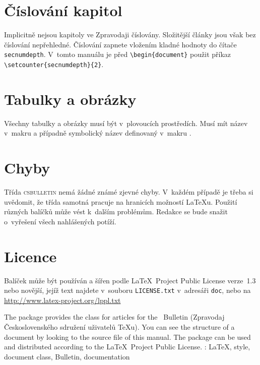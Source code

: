 \documentclass{csbulletin}
\let\pkg\textsc
\begin{document}
\section{Číslování kapitol}
Implicitně nejsou kapitoly ve Zpravodaji číslovány. Složitější články jsou však bez číslování
nepřehledné. Číslování zapnete vložením kladné hodnoty do čítače \texttt{secnumdepth}. V~tomto
manuálu je před \verb;\begin{document}; použit příkaz \verb;\setcounter{secnumdepth}{2};.

\section{Tabulky a obrázky}
Všechny
tabulky a obrázky musí být v~plovoucích prostředích. Musí mít název v~makru  a
případně symbolický název definovaný v~makru .

\section{Chyby}
Třída \pkg{csbulletin} nemá žádné známé zjevné chyby.
V~každém případě je třeba si uvědomit, že třída samotná pracuje na hranicích možností \LaTeX{}u.
Použití různých balíčků může vést k~dalším problémům. Redakce se bude snažit o~vyřešení všech
nahlášených potíží.

\section{Licence}
Balíček může být používán a šířen podle \LaTeX\ Project Public License verze~1.3 nebo novější, jejíž
text najdete v~souboru \texttt{LICENSE.txt} v~adresáři \texttt{doc}, nebo na
\url{http://www.latex-project.org/lppl.txt}

\begin{summary}
The package provides the class for articles for the \cstug\ Bulletin (Zpravodaj Československého
sdružení uživatelů \TeX u). You can see the structure of a document by looking to the source file
of this manual. The package can be used and distributed according to the \LaTeX\ Project Public
License.
  \keywords: \LaTeX, style, document class, \CSTUG{} Bulletin, documentation
\end{summary}
\end{document}
